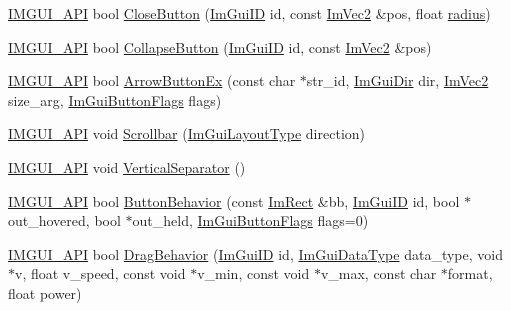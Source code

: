 \begin{DoxyCompactItemize}
\item 
\mbox{\hyperlink{imgui_8h_a43829975e84e45d1149597467a14bbf5}{I\+M\+G\+U\+I\+\_\+\+A\+PI}} bool \mbox{\hyperlink{namespace_im_gui_a5e8e4df6418dcda3c4c5d15ecdf7d968}{Close\+Button}} (\mbox{\hyperlink{imgui_8h_a1785c9b6f4e16406764a85f32582236f}{Im\+Gui\+ID}} id, const \mbox{\hyperlink{struct_im_vec2}{Im\+Vec2}} \&pos, float \mbox{\hyperlink{graphics_8cpp_a5050a760c11da521cd4aee6336f6529f}{radius}})
\item 
\mbox{\hyperlink{imgui_8h_a43829975e84e45d1149597467a14bbf5}{I\+M\+G\+U\+I\+\_\+\+A\+PI}} bool \mbox{\hyperlink{namespace_im_gui_acd027458d7a062d3d3073339454624e3}{Collapse\+Button}} (\mbox{\hyperlink{imgui_8h_a1785c9b6f4e16406764a85f32582236f}{Im\+Gui\+ID}} id, const \mbox{\hyperlink{struct_im_vec2}{Im\+Vec2}} \&pos)
\item 
\mbox{\hyperlink{imgui_8h_a43829975e84e45d1149597467a14bbf5}{I\+M\+G\+U\+I\+\_\+\+A\+PI}} bool \mbox{\hyperlink{namespace_im_gui_af8efa3144c85104fbb0aa2e7bc6a6069}{Arrow\+Button\+Ex}} (const char $\ast$str\+\_\+id, \mbox{\hyperlink{imgui_8h_a874086389bc27cc9647118d22a806403}{Im\+Gui\+Dir}} dir, \mbox{\hyperlink{struct_im_vec2}{Im\+Vec2}} size\+\_\+arg, \mbox{\hyperlink{imgui__internal_8h_a990fae518aa1d95f571ee40989de4c22}{Im\+Gui\+Button\+Flags}} flags)
\item 
\mbox{\hyperlink{imgui_8h_a43829975e84e45d1149597467a14bbf5}{I\+M\+G\+U\+I\+\_\+\+A\+PI}} void \mbox{\hyperlink{namespace_im_gui_abf1d7a83c5f0a555bbe7f831b0319c8a}{Scrollbar}} (\mbox{\hyperlink{imgui__internal_8h_a86d7bb2ee8297d38b131d8ea7e6430c6}{Im\+Gui\+Layout\+Type}} direction)
\item 
\mbox{\hyperlink{imgui_8h_a43829975e84e45d1149597467a14bbf5}{I\+M\+G\+U\+I\+\_\+\+A\+PI}} void \mbox{\hyperlink{namespace_im_gui_ae60f7b8ece8808c477796e6594c8d796}{Vertical\+Separator}} ()
\item 
\mbox{\hyperlink{imgui_8h_a43829975e84e45d1149597467a14bbf5}{I\+M\+G\+U\+I\+\_\+\+A\+PI}} bool \mbox{\hyperlink{namespace_im_gui_a65a4f18b1bc8ce0f351687922089f374}{Button\+Behavior}} (const \mbox{\hyperlink{struct_im_rect}{Im\+Rect}} \&bb, \mbox{\hyperlink{imgui_8h_a1785c9b6f4e16406764a85f32582236f}{Im\+Gui\+ID}} id, bool $\ast$out\+\_\+hovered, bool $\ast$out\+\_\+held, \mbox{\hyperlink{imgui__internal_8h_a990fae518aa1d95f571ee40989de4c22}{Im\+Gui\+Button\+Flags}} flags=0)
\item 
\mbox{\hyperlink{imgui_8h_a43829975e84e45d1149597467a14bbf5}{I\+M\+G\+U\+I\+\_\+\+A\+PI}} bool \mbox{\hyperlink{namespace_im_gui_aa92640ed1ce4a58db1976487d6c4dea2}{Drag\+Behavior}} (\mbox{\hyperlink{imgui_8h_a1785c9b6f4e16406764a85f32582236f}{Im\+Gui\+ID}} id, \mbox{\hyperlink{imgui_8h_a4cfa8697a3d76722fff83eb18922e9d5}{Im\+Gui\+Data\+Type}} data\+\_\+type, void $\ast$v, float v\+\_\+speed, const void $\ast$v\+\_\+min, const void $\ast$v\+\_\+max, const char $\ast$format, float power)

\end{DoxyCompactItemize}
